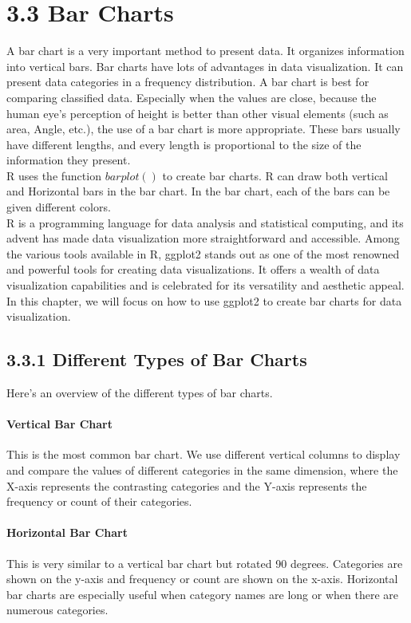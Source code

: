 \documentclass{article}\usepackage[]{graphicx}\usepackage[]{xcolor}
\begin{document}
\section*{3.3 Bar Charts}
A bar chart is a very important method to present data. It organizes information into vertical bars.  Bar charts have lots of advantages in data visualization. It can present data categories in a frequency distribution. A bar chart is best for comparing classified data. Especially when the values are close, because the human eye's perception of height is better than other visual elements (such as area, Angle, etc.), the use of a bar chart is more appropriate. These bars usually have different lengths, and every length is proportional to the size of the information they present.\\
R uses the function $barplot()$ to create bar charts. R can draw both vertical and Horizontal bars in the bar chart. In the bar chart, each of the bars can be given different colors.\\
R is a programming language for data analysis and statistical computing, and its advent has made data visualization more straightforward and accessible. Among the various tools available in R, ggplot2 stands out as one of the most renowned and powerful tools for creating data visualizations. It offers a wealth of data visualization capabilities and is celebrated for its versatility and aesthetic appeal. In this chapter, we will focus on how to use ggplot2 to create bar charts for data visualization.\\
\subsection*{3.3.1 Different Types of Bar Charts}
Here's an overview of the different types of bar charts. \\
\paragraph{Vertical Bar Chart}
This is the most common bar chart. We use different vertical columns to display and compare the values of different categories in the same dimension, where the X-axis represents the contrasting categories and the Y-axis represents the frequency or count of their categories.\\
\paragraph{Horizontal Bar Chart}
This is very similar to a vertical bar chart but rotated 90 degrees. Categories are shown on the y-axis and frequency or count are shown on the x-axis. Horizontal bar charts are especially useful when category names are long or when there are numerous categories.
\end{document}
